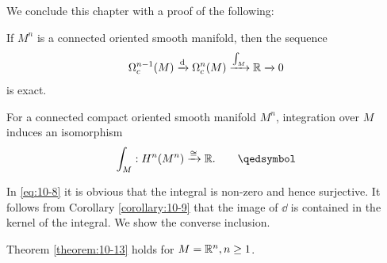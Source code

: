 We conclude this chapter with a proof of the following:

\begin{theorem}\label{theorem:10-13}
  If $M^n$ is a connected oriented smooth manifold, then the sequence
  \begin{align}\label{eq:10-8}
    \Omega^{n-1}_c(M)
    \xra[\dd] \Omega^n_c(M)
    \xra[\int_M] \RR
    \xra 0
  \end{align}
  is exact.
\end{theorem}

\begin{corollary}\label{corollary:10-14}
  For a connected compact oriented smooth manifold $M^n$, integration over $M$ induces an isomorphism
  \begin{align*}
    \int_M: H^n(M^n)\xra[\simee] \RR.\tag*{\qedsymbol}
  \end{align*}
\end{corollary}

In \eqref{eq:10-8} it is obvious that the integral is non-zero and hence surjective. It follows
from Corollary \ref{corollary:10-9} that the image of $\dd$ is contained in the kernel of the 
integral. We show the converse inclusion.

\begin{lemma}\label{lemma:10-15}
  Theorem \ref{theorem:10-13} holds for $M={\mathbb{R}}^n, n\ge 1$.
\end{lemma}

